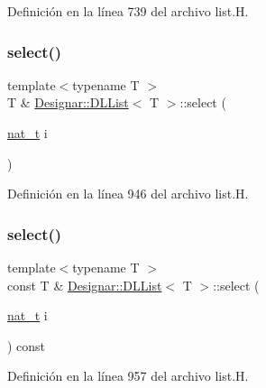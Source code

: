 Definición en la línea 739 del archivo list.\+H.

\mbox{\label{class_designar_1_1_d_l_list_abb57692be6aa79d00b65e40cd8402621}} 
\subsubsection{\texorpdfstring{select()}{select()}\hspace{0.1cm}{\footnotesize\ttfamily [1/2]}}
{\footnotesize\ttfamily template$<$typename T $>$ \\
T \& \hyperlink{class_designar_1_1_d_l_list}{Designar\+::\+D\+L\+List}$<$ T $>$\+::select (\begin{DoxyParamCaption}\item[{\hyperlink{namespace_designar_aa72662848b9f4815e7bf31a7cf3e33d1}{nat\+\_\+t}}]{i }\end{DoxyParamCaption})}



Definición en la línea 946 del archivo list.\+H.

\mbox{\label{class_designar_1_1_d_l_list_a7060ef1496f583a3d4ed64b8ffdb94c8}} 
\subsubsection{\texorpdfstring{select()}{select()}\hspace{0.1cm}{\footnotesize\ttfamily [2/2]}}
{\footnotesize\ttfamily template$<$typename T $>$ \\
const T \& \hyperlink{class_designar_1_1_d_l_list}{Designar\+::\+D\+L\+List}$<$ T $>$\+::select (\begin{DoxyParamCaption}\item[{\hyperlink{namespace_designar_aa72662848b9f4815e7bf31a7cf3e33d1}{nat\+\_\+t}}]{i }\end{DoxyParamCaption}) const}



Definición en la línea 957 del archivo list.\+H.

\mbox{\label{class_designar_1_1_d_l_list_a77234df6ebb6620ecf124e1810d9741c}} 

